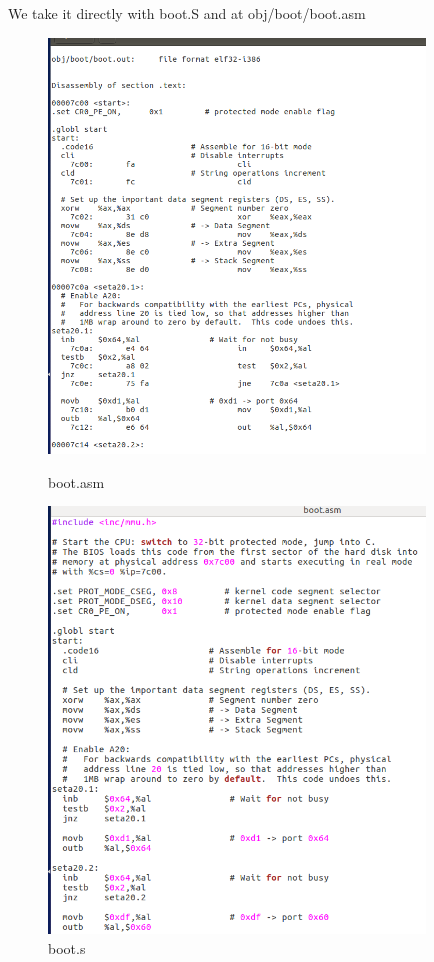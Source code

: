 We take it directly with boot.S and at obj/boot/boot.asm

\begin{figure}[H]
\centering
\begin{minipage}[t]{0.7\textwidth}
\centering
\includegraphics[width=10cm]{figure/boot_asm}
\caption{boot.asm}
\end{minipage}
\begin{minipage}[t]{0.7\textwidth}
\centering
\includegraphics[width=10cm]{figure/boot_s}
\caption{boot.s}
\end{minipage}
\end{figure}

